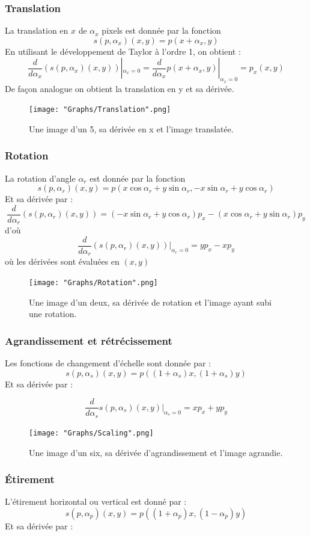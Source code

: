 \documentclass[a4paper,11pt,twoside]{report}
\begin{document}
\subsubsection{Translation}
La translation en $x$ de $\alpha_x$ pixels est donnée par la fonction $$s(p,\alpha_x)(x,y) = p(x+\alpha_x,y)$$ 
En utilisant le développement de Taylor à l'ordre 1, on obtient :
$$\frac{d}{d\alpha_x}(s(p,\alpha_x)(x,y))|_{\alpha_x=0} = \frac{d}{d\alpha_x}p(x+\alpha_x,y)|_{\alpha_x=0}=p_x(x,y)$$ 
De façon analogue on obtient la translation en y et sa dérivée.

\begin{figure}[H]
  	\texttt{[image: "Graphs/Translation".png]}
  	\caption{Une image d'un 5, sa dérivée en x et l'image translatée.}
\end{figure}

\subsubsection{Rotation}
La rotation d'angle $\alpha_r$ est donnée par la fonction $$s(p,\alpha_r)(x,y) = p(x\cos\alpha_r+y\sin\alpha_r,-x\sin\alpha_r+y\cos\alpha_r)$$ 
Et sa dérivée par :
$$\frac{d}{d\alpha_r}(s(p,\alpha_r)(x,y))= (-x\sin\alpha_r+y\cos\alpha_r)p_x - (x\cos\alpha_r+y\sin\alpha_r)p_y$$
d'où
$$\frac{d}{d\alpha_r}(s(p,\alpha_r)(x,y))|_{\alpha_r=0}=yp_x-xp_y$$ 
où les dérivées sont évaluées en $(x,y)$

\begin{figure}[H]
  	\texttt{[image: "Graphs/Rotation".png]}
  	\caption{Une image d'un deux, sa dérivée de rotation et l'image ayant subi une rotation.}
\end{figure}
\subsubsection{Agrandissement et rétrécissement}
Les fonctions de changement d'échelle sont donnée par : $$s(p,\alpha_s)(x,y) = p((1+\alpha_s)x,(1+\alpha_s)y)$$  
Et sa dérivée par :

$$\frac{d}{d\alpha_s}s(p,\alpha_s)(x,y)|_{\alpha_s=0}=xp_x+yp_y$$ 

\begin{figure}[H]
  	\texttt{[image: "Graphs/Scaling".png]}
  	\caption{Une image d'un six, sa dérivée d'agrandissement et l'image agrandie.}
\end{figure}

\subsubsection{Étirement}
L'étirement horizontal ou vertical est donné par : $$s(p,\alpha_p)(x,y) = p((1+\alpha_p)x,(1-\alpha_p)y)$$  
Et sa dérivée par :
\end{document}
